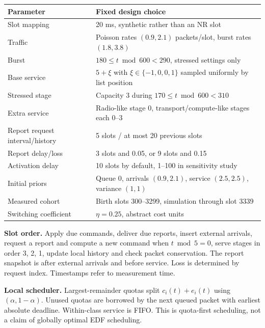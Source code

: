 \documentclass[10pt,a4paper]{article}
\begin{document}
\begin{center}\small
\begin{tabular}{p{53mm}p{98mm}}
\toprule Parameter & Fixed design choice\\\midrule
Slot mapping & 20 ms, synthetic rather than an NR slot\\
Traffic & Poisson rates $(0.9,2.1)$ packets/slot, burst rates $(1.8,3.8)$\\
Burst & $180\le t\bmod600<290$, stressed settings only\\
Base service & $5+\xi$ with $\xi\in\{-1,0,0,1\}$ sampled uniformly by list position\\
Stressed stage & Capacity 3 during $170\le t\bmod600<310$\\
Extra service & Radio-like stage 0, transport/compute-like stages each 0--3\\
Report request interval/history & 5 slots / at most 20 previous slots\\
Report delay/loss & 3 slots and 0.05, or 9 slots and 0.15\\
Activation delay & 10 slots by default, 1--100 in sensitivity study\\
Initial priors & Queue 0, arrivals $(0.9,2.1)$, service $(2.5,2.5)$, variance $(1,1)$\\
Measured cohort & Birth slots 300--3299, simulation through slot 3339\\
Switching coefficient & $\eta=0.25$, abstract cost units\\\bottomrule
\end{tabular}\end{center}

\textbf{Slot order.} Apply due commands, deliver due reports, insert external
arrivals, request a report and compute a new command when $t\bmod5=0$, serve
stages in order 3, 2, 1, update local history and check packet conservation.
The report snapshot is after external arrivals and before service. Loss is
determined by request index. Timestamps refer to measurement time.

\textbf{Local scheduler.} Largest-remainder quotas split $c_i(t)+e_i(t)$ using
$(\alpha,1-\alpha)$. Unused quotas are borrowed by the next queued packet with
earliest absolute deadline. Within-class service is FIFO. This is quota-first
scheduling, not a claim of globally optimal EDF scheduling.
\end{document}
